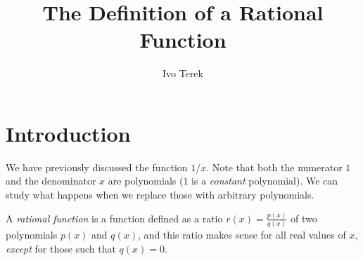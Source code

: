 \documentclass{ximera}
\author{Ivo Terek}
\title{The Definition of a Rational Function}
\begin{document}
\licenseSZ
\begin{abstract}
\end{abstract}
\maketitle


%



\section{Introduction}

We have previously discussed the function $1/x$. Note that both the numerator $1$ and the denominator $x$ are polynomials ($1$ is a \emph{constant} polynomial). We can study what happens when we replace those with arbitrary polynomials.

\begin{definition}
  A \emph{rational function} is a function defined as a ratio $r(x) = \frac{p(x)}{q(x)}$ of two polynomials $p(x)$ and $q(x)$, and this ratio makes sense for all real values of $x$, \emph{except} for those such that $q(x) = 0$.
\end{definition}
\end{document}
